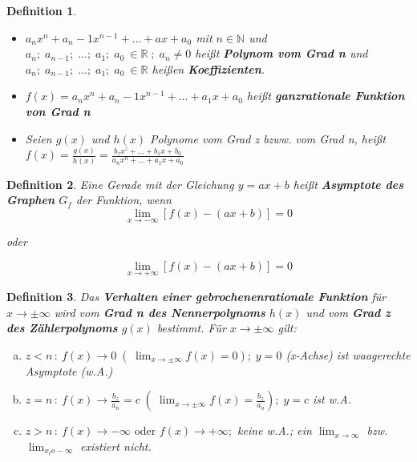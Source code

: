 \documentclass{book}
\newtheorem{definition}{Definition}
\begin{document}
\begin{definition}
    \hfill
    \begin{itemize}
        \item $a_nx^n +a_n-1x^{n-1} + \dots + ax+a_0$ mit $n \in \mathbb{N}$ und $a_n; \; a_{n-1};\;\dots;\;a_1;\;a_0 \ \in \mathbb{R} \; ; \; a_n \not = 0$
            heißt \textbf{Polynom vom Grad n} und $ a_n; \; a_{n-1};\;\dots;\;a_1;\;a_0 \ \in \mathbb{R}$ heißen \textbf{Koeffizienten}.
        \item $f(x) = a_nx^n +a_n-1x^{n-1} + \dots + a_1x+a_0$ heißt \textbf{ganzrationale Funktion von Grad n}
    \item Seien $g(x) $ und $h(x)$ Polynome vom Grad z bzww. vom Grad n, heißt $f(x) = \frac{g(x)}{h(x)} = \frac{b_zx^z+\dots+b_1x+b_0}{a_nx^n+\dots+a_1x+a_0}$
    \end{itemize}
    
\end{definition}

\begin{definition}

    Eine Gerade mit der Gleichung $ y=ax+b$ heißt \textbf{Asymptote des Graphen} $G_f$ der Funktion, wenn \[\lim_{x\to-\infty}[f(x)-(ax+b)]=0\] 
    \begin{center} oder \end{center}
    \[\lim_{x\to+\infty}[f(x)-(ax+b)]=0\]

    
\end{definition} 

\begin{definition}

    Das \textbf{Verhalten einer gebrochenenrationale Funktion} für $x\to \pm\infty$ wird vom \textbf{Grad n des Nennerpolynoms} $h(x)$ und vom \textbf{Grad z des Zählerpolynoms} $g(x)$ bestimmt. Für $x\to\pm\infty$ gilt:
    \begin{enumerate}[a)]
    \item $z<n \,:\: f(x) \to 0 \;( \;\lim_{x\to\pm\infty}f(x) = 0);\; y=0$ (x-Achse) ist waagerechte Asymptote (w.A.)
    \item $z = n \, : \: f(x) \to \frac {b_z}{a_n} = c \; ( \; \lim_{x\to\pm\infty} f(x) = \frac {b_z}{a_n});\;y=c$ ist w.A.
    \item $z>n \,:\: f(x) \to -\infty \text{ oder } f(x) \to +\infty; $ keine w.A.; ein $\lim_{x\to\infty}$ bzw. $\lim_{x_to-\infty}$ existiert nicht.
    \end{enumerate}

\end{definition}
\end{document}
